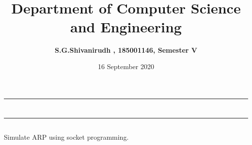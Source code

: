 \documentclass[12pt,letterpaper]{article}
\title{\textbf{Department of Computer Science and Engineering}}
\author{\textbf{S.G.Shivanirudh , 185001146, Semester V }}
\date{16 September 2020}
\begin{document}
\maketitle
\hrule
\section*{}
\hrule 
\bigskip\bigskip

\subsection*{}

\subsection*{}
\begin{flushleft}
Simulate ARP using socket programming.
\end{flushleft}

\subsection*{}
\subsubsection*{}
\begin{flushleft}

\end{flushleft}

\subsubsection*{}
\begin{flushleft}

\end{flushleft}

\subsection*{}
\subsubsection*{}
\begin{flushleft}

\end{flushleft}
\end{document}
